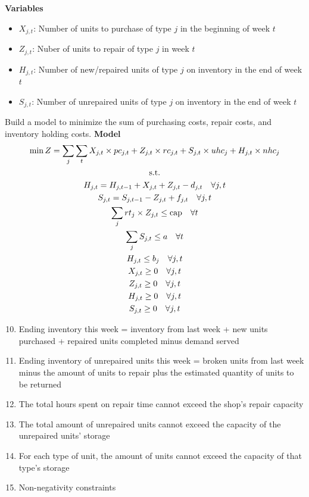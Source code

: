 \documentclass[10pt]{article}
\begin{document}
\textbf{Variables}
\begin{itemize}
    \item $X_{j, t} $: Number of units to purchase of type $j $ in the beginning of week $ t $
    \item $Z_{j, t} $: Nuber of units to repair of type $j $ in week $ t $
    \item $H_{j, t} $: Number of new/repaired units of type $j $ on inventory in the end of week $t $
    \item $S_{j, t} $: Number of unrepaired units of type $j $ on inventory in the end of week $t $
\end{itemize}

Build a model to minimize the sum of purchasing costs, repair costs, and inventory holding costs.
\newpage 
\textbf{Model}
\begin{gather}
    \min Z = \sum_{j}\sum_tX_{j, t}\times pc_{j, t} + Z_{j, t}\times rc_{j, t} + S_{j, t}\times uhc_j + H_{j, t}\times nhc_j\notag\\
    \text{s.t.}\notag\\
    H_{j, t} = H_{j, t - 1} + X_{j, t} + Z_{j, t} - d_{j, t} \quad\forall j, t\\
    S_{j, t} = S_{j, t - 1} - Z_{j, t} + f_{j, t}\quad\forall j, t\\
    \sum_j rt_j\times Z_{j, t} \le \text{cap}\quad\forall t\\
    \sum_j S_{j, t} \le a\quad\forall t\\
    H_{j, t} \le b_j\quad\forall j, t\\
    X_{j, t} \ge 0\quad\forall j, t\\
    Z_{j, t} \ge 0\quad\forall j, t\\
    H_{j, t} \ge 0\quad\forall j, t\\
    S_{j, t} \ge 0\quad\forall j, t
\end{gather}
\begin{enumerate}
    \setcounter{enumi}{9}
    \item Ending inventory this week = inventory from last week + new units purchased + repaired units completed minus demand served 
    \item Ending inventory of unrepaired units this week = broken units from last week minus the amount of units to repair plus the estimated quantity of units to be returned 
    \item The total hours spent on repair time cannot exceed the shop's repair capacity
    \item The total amount of unrepaired units cannot exceed the capacity of the unrepaired units' storage 
    \item For each type of unit, the amount of units cannot exceed the capacity of that type's storage 
    \item Non-negativity constraints 
\end{enumerate}
\end{document}
